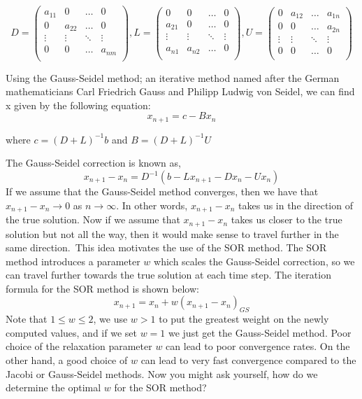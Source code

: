 \documentclass[11pt]{article}
\begin{document}
\[
D = \begin{pmatrix}
 a_{11} & 0 & \dots & 0 \\
 0 & a_{22} & \dots & 0 \\
 \vdots & \vdots & \ddots & \vdots \\ 
 0 & 0 & \dots & a_{nm} \\
\end{pmatrix}
,%
L = \begin{pmatrix}
 0 & 0 & \dots & 0 \\
 a_{21} & 0 & \dots & 0 \\
 \vdots & \vdots & \ddots & \vdots \\ 
 a_{n1} & a_{n2} & \dots & 0 \\
\end{pmatrix}
,%
U = \begin{pmatrix}
 0 & a_{12} & \dots & a_{1n}\\
 0 & 0 & \dots & a_{2n}\\
 \vdots & \vdots & \ddots & \vdots \\ 
 0 & 0 & \dots & 0 \\
\end{pmatrix}
\]

Using the Gauss-Seidel method; an iterative method named after the German mathematicians Carl Friedrich Gauss and Philipp Ludwig von Seidel, we can find x given by the following equation:
\begin{equation*}
    x_{n+1} = c - Bx_n
\end{equation*}
\begin{center}
where $c = (D+L)^{-1}b$ and $B = (D+L)^{-1}U$
\end{center}
\vspace{-5pt}
The Gauss-Seidel correction is known as,
\begin{equation*}
x_{n+1}-x_{n} = D^{-1}(b-Lx_{n+1}-Dx_n-Ux_n)
\end{equation*}
If we assume that the Gauss-Seidel method converges, then we have that $x_{n+1}-x_{n}\to 0$ as $n \to \infty$. In other words, $x_{n+1}-x_{n}$ takes us in the direction of the true solution. Now if we assume that $x_{n+1}-x_{n}$ takes us closer to the true solution but not all the way, then it would make sense to travel further in the same direction.\ This idea motivates the use of the SOR method. The SOR method introduces a parameter $w$ which scales the Gauss-Seidel correction, so we can travel further towards the true solution at each time step. The iteration formula for the SOR method is shown below:
\begin{equation*}
x_{n+1} = x_n + w(x_{n+1}-x_{n})_{GS}
\end{equation*}
Note that $1 \leq w \leq 2$, we use $w>1$ to put the greatest weight on the newly computed values, and if we set $w=1$ we just get the Gauss-Seidel method. Poor choice of the relaxation parameter $w$ can lead to poor convergence rates. On the other hand, a good choice of $w$ can lead to very fast convergence compared to the Jacobi or Gauss-Seidel methods. Now
you might ask yourself, how do we determine the optimal $w$ for the SOR method?
\end{document}
